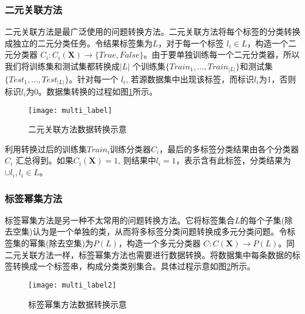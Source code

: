 \documentclass[a4paper, twocolumn]{article}
\begin{document}
\begin{CJK}{UTF8}{gbsn}
	\subsubsection{二元关联方法}
	二元关联方法是最广泛使用的问题转换方法。二元关联方法将每个标签的分类转换成独立的二元分类任务。令结果标签集为$ L $，对于每一个标签 $ l_i \in L $，构造一个二元分类器 $ C_i : C_i(\textbf{X}) \rightarrow \{True, False\} $。由于要单独训练每一个二元分类器，所以我们将训练集和测试集都转换成$ | L | $ 个训练集$ \{Train_1, \dots, Train_{|L|}\} $和测试集$ \{Test_1, \dots, Test_{|L|}\} $。针对每一个 $ l_i $, 若源数据集中出现该标签，而标识$ l_i $为1，否则标识$ l_i $为0。数据集转换的过程如图\ref{fig:multi_label}所示。
	\begin{figure}[h]
	\centering
	\texttt{[image: multi\_label]}
	\caption{二元关联方法数据转换示意}
	\label{fig:multi_label}
	\end{figure}
	\newline
	利用转换过后的训练集$ Train_i $训练分类器$ C_i $，最后的多标签分类结果由各个分类器$ C_i $ 汇总得到。如果$ C_i(\textbf{X}) = 1 $, 则结果中$ l_i = 1 $，表示含有此标签，分类结果为 $ \cup l_i, l_i \in L $。
	\subsubsection{标签幂集方法}
	标签幂集方法是另一种不太常用的问题转换方法。它将标签集合$ L $的每个子集(除去空集)认为是一个单独的类，从而将多标签分类问题转换成多元分类问题。令标签集的幂集(除去空集)为$ P(L) $，构造一个多元分类器 $ C : C(\textbf{X}) \rightarrow P(L) $。同二元关联方法一样，标签幂集方法也需要进行数据转换。将数据集中每条数据的标签转换成一个标签串，构成分类类别集合。具体过程示意如图\ref{fig:multi_label2}所示。
	\begin{figure}[h]
	\centering
	\texttt{[image: multi\_label2]}
	\caption{标签幂集方法数据转换示意}
	\label{fig:multi_label2}
	\end{figure}

\end{CJK}
\end{document}
